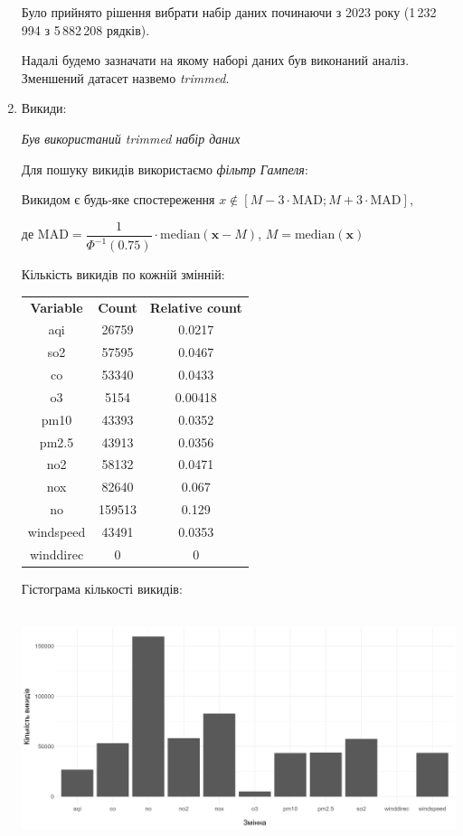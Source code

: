 \documentclass{article}
\begin{document}
\begin{enumerate}
    Було прийнято рішення вибрати набір даних починаючи з 2023 року 
    (1\,232\,994 з 5\,882\,208 рядків).

    Надалі будемо зазначати на якому наборі даних був виконаний аналіз. Зменшений
    датасет назвемо \textit{trimmed}.
    
    \item Викиди:

    \quad \textit{Був використаний trimmed набір даних}
    
    Для пошуку викидів використаємо \textit{фільтр Гампеля}:

    \begin{displayquote}
    Викидом є будь‑яке спостереження 
    $x \notin [M - 3 \cdot \text{MAD}; M + 3 \cdot \text{MAD}]$, 
    
    де $\text{MAD} = \dfrac{1}{\Phi^{-1}(0.75)} \cdot \text{median}(\pmb{x} - M)$,
    $M = \text{median}(\pmb{x})$
    \end{displayquote}

    Кількість викидів по кожній змінній:

    \begin{tabular}{ccc}
    \textbf{Variable} & \textbf{Count} & \textbf{Relative count} \\
    aqi        & 26759  & 0.0217  \\
    so2        & 57595  & 0.0467  \\
    co         & 53340  & 0.0433  \\
    o3         & 5154   & 0.00418 \\
    pm10       & 43393  & 0.0352  \\
    pm2.5      & 43913  & 0.0356  \\
    no2        & 58132  & 0.0471  \\
    nox        & 82640  & 0.067   \\
    no         & 159513 & 0.129   \\
    windspeed  & 43491  & 0.0353 \\
    winddirec  & 0      & 0       \\
    \end{tabular}

   \pagebreak
    
    Гістограма кількості викидів:

    \includegraphics[height=2.7in]{plots/outliers/count-bar.png}
    

\end{enumerate}
\end{document}
